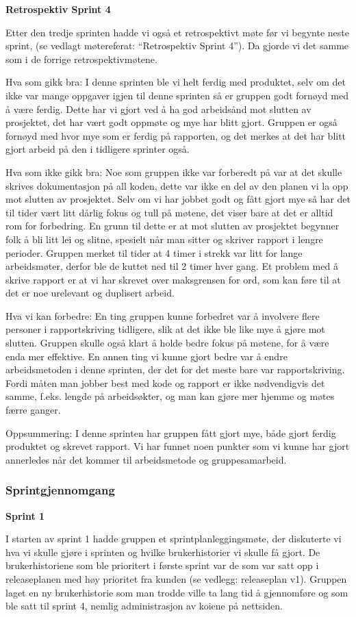 \documentclass[12pt,a4paper,norsk]{article}
\begin{document}
\bigskip \noindent \textbf{Retrospektiv Sprint 4}
\par Etter den tredje sprinten hadde vi også et retrospektivt møte før vi begynte neste sprint, (se vedlagt møtereferat: “Retrospektiv Sprint 4”). Da gjorde vi det samme som i de forrige retrospektivmøtene. 

Hva som gikk bra:
I denne sprinten ble vi helt ferdig med produktet, selv om det ikke var mange oppgaver igjen til denne sprinten så er gruppen godt fornøyd med å være ferdig. Dette har vi gjort ved å ha god arbeidsånd mot slutten av prosjektet, det har vært godt oppmøte og mye har blitt gjort. 
Gruppen er også fornøyd med hvor mye som er ferdig på rapporten, og det merkes at det har blitt gjort arbeid på den i tidligere sprinter også. 

Hva som ikke gikk bra:
Noe som gruppen ikke var forberedt på var at det skulle skrives dokumentasjon på all koden, dette var ikke en del av den planen vi la opp mot slutten av prosjektet. 
Selv om vi har jobbet godt og fått gjort mye så har det til tider vært litt dårlig fokus og tull på møtene, det viser bare at det er alltid rom for forbedring. En grunn til dette er at mot slutten av prosjektet begynner folk å bli litt lei og slitne, spesielt når man sitter og skriver rapport i lengre perioder. Gruppen merket til tider at 4 timer i strekk var litt for lange arbeidsmøter, derfor ble de kuttet ned til 2 timer hver gang.
Et problem med å skrive rapport er at vi har skrevet over maksgrensen for ord, som kan føre til at det er noe urelevant og duplisert arbeid. 

Hva vi kan forbedre:
En ting gruppen kunne forbedret var å involvere flere personer i rapportskriving tidligere, slik at det ikke ble like mye å gjøre mot slutten. 
Gruppen skulle også klart å holde bedre fokus på møtene, for å være enda mer effektive. 
En annen ting vi kunne gjort bedre var å endre arbeidsmetoden i denne sprinten, der det for det meste bare var rapportskriving. Fordi måten man jobber best med kode og rapport er ikke nødvendigvis det samme, f.eks. lengde på arbeidsøkter, og man kan gjøre mer hjemme og møtes færre ganger. 

Oppsummering:  
I denne sprinten har gruppen fått gjort mye, både gjort ferdig produktet og skrevet rapport. Vi har funnet noen punkter som vi kunne har gjort annerledes når det kommer til arbeidsmetode og gruppesamarbeid. 

	\subsubsection{Sprintgjennomgang}
\bigskip \noindent \textbf{Sprint 1}
\par I starten av sprint 1 hadde gruppen et sprintplanleggingsmøte, der diskuterte vi hva vi skulle gjøre i sprinten og hvilke brukerhistorier vi skulle få gjort. De brukerhistoriene som ble prioritert i første sprint var de som var satt opp i releaseplanen med høy prioritet fra kunden (se vedlegg: releaseplan v1). Gruppen laget en ny brukerhistorie som man trodde ville ta lang tid å gjennomføre og som ble satt til sprint 4, nemlig administrasjon av koiene på nettsiden. 
\end{document}
